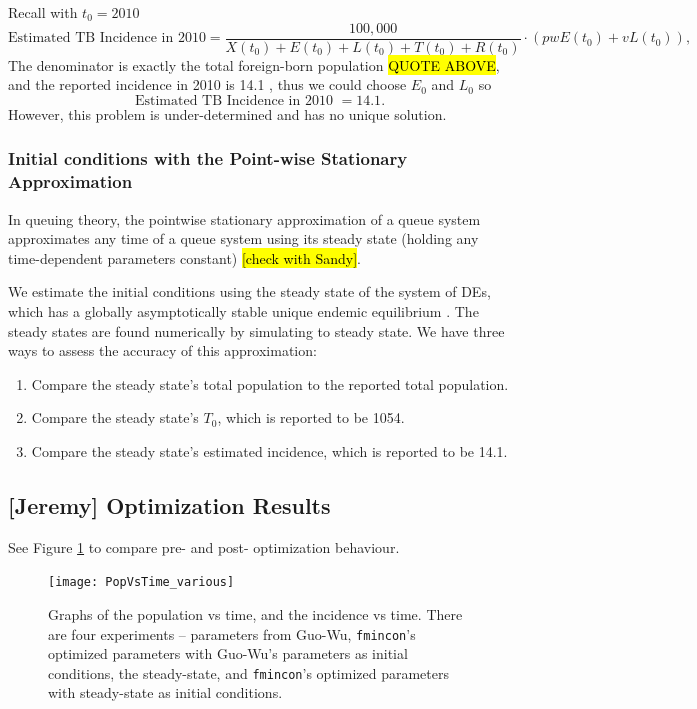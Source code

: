 \documentclass[sn-mathphys,Numbered]{sn-jnl}%
\theoremstyle{thmstyleone}%
\theoremstyle{thmstyletwo}%
\theoremstyle{thmstylethree}%
\begin{document}
Recall with $t_0=2010$
  	$$\text{Estimated TB Incidence in 2010} = \frac{100,000}{X(t_0)+E(t_0)+L(t_0)+T(t_0)+R(t_0)} \cdot (pw E(t_0) + v L(t_0)) ,$$
The denominator is exactly the total foreign-born population \hl{QUOTE ABOVE}, and the reported incidence in 2010 is 14.1 \cite{MounchiliA.2022TuberculosisReport}, thus we could choose $E_0$ and $L_0$ so $$\text{Estimated TB Incidence in 2010~} = 14.1. $$
However, this problem is under-determined and has no unique solution.


\subsubsection{Initial conditions with the Point-wise Stationary Approximation}

In queuing theory, the pointwise stationary approximation of a queue system approximates any time of a queue system using its steady state (holding any time-dependent parameters constant) \cite{Whitt1991} \hl{[check with Sandy]}.

We estimate the initial conditions using the steady state of the system of DEs, which has a globally asymptotically stable unique endemic equilibrium \cite{Guo2011PersistentLatency}.  The steady states are found numerically by simulating to steady state.  We have three ways to assess the accuracy of this approximation:
\begin{enumerate}
    \item Compare the steady state's total population to the reported total population.
    \item Compare the steady state's $T_0$, which is reported to be 1054.
    \item Compare the steady state's estimated incidence, which is reported to be 14.1.
\end{enumerate}



\subsection{[Jeremy] Optimization Results}

See Figure \ref{fig:OptimizedResults} to compare pre- and post- optimization behaviour.

\begin{figure}
    \texttt{[image: PopVsTime\_various]}

    \caption{Graphs of the population vs time, and the incidence vs time.  There are four experiments -- parameters from Guo-Wu\cite{Guo2011PersistentLatency}, \texttt{fmincon}'s optimized parameters with Guo-Wu's parameters as initial conditions, the steady-state, and \texttt{fmincon}'s optimized parameters with steady-state as initial conditions. }
    \label{fig:OptimizedResults}
\end{figure}
\end{document}
